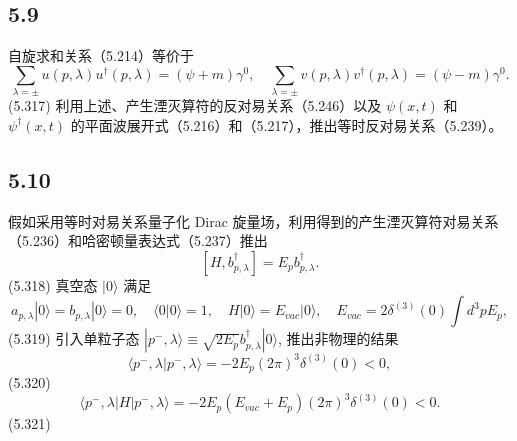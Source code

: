 \newpage
\subsection{5.9}
自旋求和关系（5.214）等价于
$$\sum_{\lambda = \pm} u(p, \lambda) u^\dagger (p, \lambda) = (\psi + m) \gamma^0, \quad \sum_{\lambda = \pm} v(p, \lambda) v^\dagger (p, \lambda) = (\psi - m) \gamma^0.$$
(5.317)
利用上述、产生湮灭算符的反对易关系（5.246）以及 $\psi(x,t)$ 和 $\psi^\dagger(x,t)$ 的平面波展开式（5.216）和（5.217），推出等时反对易关系（5.239）。

\newpage
\subsection{5.10}
假如采用等时对易关系量子化 Dirac 旋量场，利用得到的产生湮灭算符对易关系（5.236）和哈密顿量表达式（5.237）推出
$$[H, b_{p, \lambda}^\dagger] = E_p b_{p, \lambda}^\dagger.$$
(5.318)
真空态 $|0\rangle$ 满足
$$a_{p, \lambda}|0\rangle = b_{p, \lambda}|0\rangle = 0, \quad \langle 0|0\rangle = 1, \quad H|0\rangle = E_{vac}|0\rangle, \quad E_{vac} = 2\delta^{(3)}(0) \int d^3 p E_p,$$
(5.319)
引入单粒子态 $|p^- , \lambda\rangle \equiv \sqrt{2E_p} b_{p, \lambda}^\dagger |0\rangle$, 推出非物理的结果
$$\langle p^- , \lambda | p^- , \lambda\rangle = -2E_p (2\pi)^3 \delta^{(3)}(0) < 0,$$
(5.320)
$$\langle p^- , \lambda | H | p^- , \lambda\rangle = -2E_p (E_{vac} + E_p)(2\pi)^3 \delta^{(3)}(0) < 0.$$
(5.321)